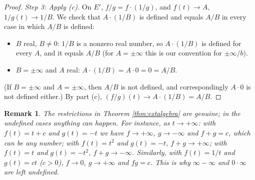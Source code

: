\documentclass{article}
\theoremstyle{mythm}
\newtheorem{remark}[theorem]{Remark}
\begin{document}
\begin{proof}
\textit{Step 3: Apply (c).} On $E'$, $f/g = f \cdot (1/g)$, and $f(t) \to A$, $1/g(t) \to 1/B$. We check that $A \cdot (1/B)$ is defined and equals $A/B$ in every case in which $A/B$ is defined:
\begin{itemize}
    \item $B$ real, $B \neq 0$: $1/B$ is a nonzero real number, so $A \cdot (1/B)$ is defined for every $A$, and it equals $A/B$ (for $A = \pm\infty$ this is our convention for $\pm\infty/b$).
    \item $B = \pm\infty$ and $A$ real: $A \cdot (1/B) = A \cdot 0 = 0 = A/B$.
\end{itemize}
(If $B = \pm\infty$ and $A = \pm\infty$, then $A/B$ is not defined, and correspondingly $A \cdot 0$ is not defined either.) By part (c), $(f/g)(t) \to A \cdot (1/B) = A/B$.
\end{proof}

\begin{remark}
The restrictions in Theorem \ref{thm:extalgebra} are genuine; in the undefined cases anything can happen. For instance, as $t \to +\infty$: with $f(t) = t + c$ and $g(t) = -t$ we have $f \to +\infty$, $g \to -\infty$ and $f + g = c$, which can be any number; with $f(t) = t^2$ and $g(t) = -t$, $f + g \to +\infty$; with $f(t) = t$ and $g(t) = -t^2$, $f + g \to -\infty$. Similarly, with $f(t) = 1/t$ and $g(t) = ct$ ($c > 0$), $f \to 0$, $g \to +\infty$ and $fg = c$. This is why $\infty - \infty$ and $0 \cdot \infty$ are left undefined.
\end{remark}
\end{document}
